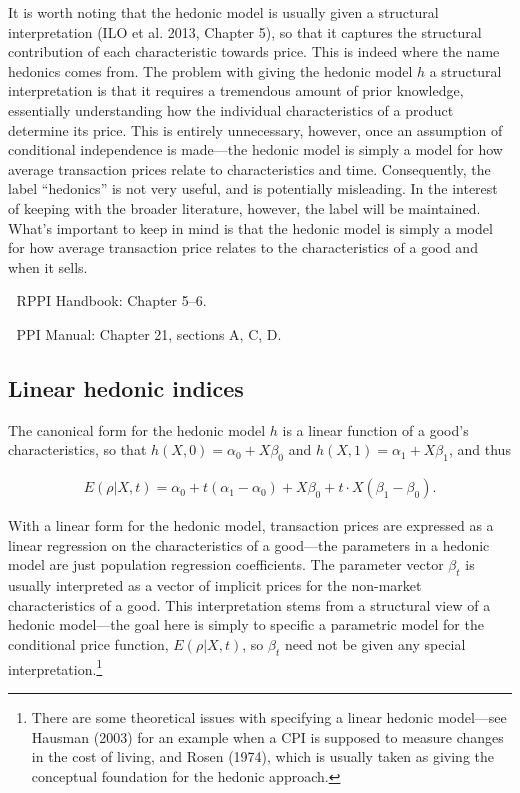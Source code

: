 \documentclass[]{article}
\begin{document}
It is worth noting that the hedonic model is usually given a structural interpretation (ILO et al. 2013, Chapter 5), so that it captures the structural contribution of each characteristic towards price. This is indeed where the name hedonics comes from. The problem with giving the hedonic model \(h\) a structural interpretation is that it requires a tremendous amount of prior knowledge, essentially understanding how the individual characteristics of a product determine its price. This is entirely unnecessary, however, once an assumption of conditional independence is made---the hedonic model is simply a model for how average transaction prices relate to characteristics and time. Consequently, the label ``hedonics'' is not very useful, and is potentially misleading. In the interest of keeping with the broader literature, however, the label will be maintained. What's important to keep in mind is that the hedonic model is simply a model for how average transaction price relates to the characteristics of a good and when it sells.

📖 RPPI Handbook: Chapter 5--6.

📖 PPI Manual: Chapter 21, sections A, C, D.

\hypertarget{linear-hedonic-indices}{%
\subsection{Linear hedonic indices}\label{linear-hedonic-indices}}

The canonical form for the hedonic model \(h\) is a linear function of a good's characteristics, so that \(h(X, 0) = \alpha_{0} + X\beta_{0}\) and \(h(X, 1) = \alpha_{1} + X\beta_{1}\), and thus

\begin{align*}
E(\rho | X, t) = \alpha_{0} + t(\alpha_{1} - \alpha_{0}) + X\beta_{0} + t \cdot X (\beta_{1} - \beta_{0}).
\end{align*}

With a linear form for the hedonic model, transaction prices are expressed as a linear regression on the characteristics of a good---the parameters in a hedonic model are just population regression coefficients. The parameter vector \(\beta_{t}\) is usually interpreted as a vector of implicit prices for the non-market characteristics of a good. This interpretation stems from a structural view of a hedonic model---the goal here is simply to specific a parametric model for the conditional price function, \(E(\rho | X, t)\), so \(\beta_{t}\) need not be given any special interpretation.\footnote{There are some theoretical issues with specifying a linear hedonic model---see Hausman (2003) for an example when a CPI is supposed to measure changes in the cost of living, and Rosen (1974), which is usually taken as giving the conceptual foundation for the hedonic approach.}
\end{document}
